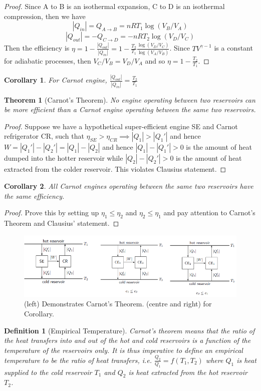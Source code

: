 \documentclass[a4paper]{article}
\theoremstyle{new}
\newtheorem{defi}{Definition}[section]
\newtheorem{thm}{Theorem}[section]
\newtheorem{cor}{Corollary}[section]
\begin{document}
\begin{proof}
Since A to B is an isothermal expansion, C to D is an isothermal compression, then we have
$$|Q_{in}|=Q_{A\rightarrow B}=nRT_1\log(V_B/V_A)$$
$$|Q_{out}|=-Q_{C\rightarrow D}=-nRT_2\log(V_D/V_C)$$
Then the efficiency is $\eta=1-\frac{|Q_{out}|}{|Q_{in}|}=1-\frac{T_2}{T_1}\frac{\log(V_D/V_C)}{\log(V_A/V_B)}$. Since $TV^{\gamma-1}$ is a constant for adiabatic processes, then $V_C/V_B=V_D/V_A$ and so $\eta=1-\frac{T_2}{T_1}$.
\end{proof}
\begin{cor}
For Carnot engine, $\frac{|Q_{out}|}{|Q_{in}|}=\frac{T_2}{T_1}$
\end{cor}
\begin{thm}[Carnot's Theorem]
No engine operating between two reservoirs can be more efficient than a Carnot engine operating between the same two reservoirs.
\end{thm}
\begin{proof}
Suppose we have a hypothetical super-efficient engine SE and Carnot refrigerator CR, such that $\eta_{SE}>\eta_{CR}\implies|Q_1|>|Q_1'|$ and hence $W=|Q_1'|-|Q_2'|=|Q_1|-|Q_2|$ and hence $|Q_1|-|Q_1'|>0$ is the amount of heat dumped into the hotter reservoir while $|Q_2|-|Q_2'|>0$ is the amount of heat extracted from the colder reservoir. This violates Clausius statement.
\end{proof}
\begin{cor}
All Carnot engines operating between the same two reservoirs have the same efficiency.
\end{cor}
\begin{proof}
Prove this by setting up $\eta_1\leq\eta_2$ and $\eta_2\leq\eta_1$ and pay attention to Carnot's Theorem and Clausius' statement.
\end{proof}
\begin{figure}[H]
    \centering
    \includegraphics[scale=0.7]{secondlaw3.PNG}
    \caption{(left) Demonstrates Carnot's Theorem. (centre and right) for Corollary. \cite{blundell2010concepts}}
\end{figure}
\begin{defi}[Empirical Temperature]
Carnot's theorem means that the ratio of the heat transfers into and out of the hot and cold reservoirs is a function of the temperature of the reservoirs only. It is thus imperative to define an empirical temperature to be the ratio of heat transfers, i.e. $\frac{Q_2}{Q_1}=f(T_1,T_2)$ where $Q_1$ is heat supplied to the cold reservoir $T_1$ and $Q_2$ is heat extracted from the hot reservoir $T_2$.
\end{defi}
\end{document}
